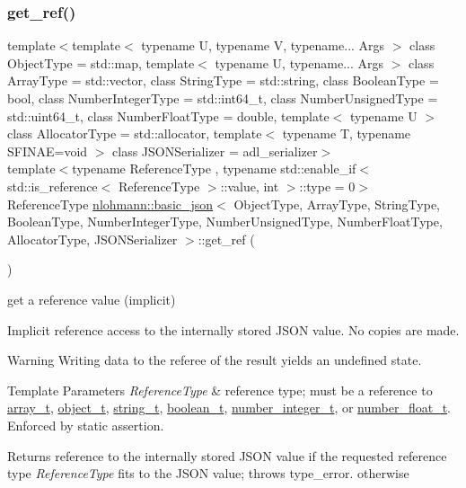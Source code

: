 \subsubsection{\texorpdfstring{get\+\_\+ref()}{get\_ref()}\hspace{0.1cm}{\footnotesize\ttfamily [1/2]}}
{\footnotesize\ttfamily template$<$template$<$ typename U, typename V, typename... Args $>$ class Object\+Type = std\+::map, template$<$ typename U, typename... Args $>$ class Array\+Type = std\+::vector, class String\+Type  = std\+::string, class Boolean\+Type  = bool, class Number\+Integer\+Type  = std\+::int64\+\_\+t, class Number\+Unsigned\+Type  = std\+::uint64\+\_\+t, class Number\+Float\+Type  = double, template$<$ typename U $>$ class Allocator\+Type = std\+::allocator, template$<$ typename T, typename S\+F\+I\+N\+A\+E=void $>$ class J\+S\+O\+N\+Serializer = adl\+\_\+serializer$>$ \\
template$<$typename Reference\+Type , typename std\+::enable\+\_\+if$<$ std\+::is\+\_\+reference$<$ Reference\+Type $>$\+::value, int $>$\+::type  = 0$>$ \\
Reference\+Type \mbox{\hyperlink{classnlohmann_1_1basic__json}{nlohmann\+::basic\+\_\+json}}$<$ Object\+Type, Array\+Type, String\+Type, Boolean\+Type, Number\+Integer\+Type, Number\+Unsigned\+Type, Number\+Float\+Type, Allocator\+Type, J\+S\+O\+N\+Serializer $>$\+::get\+\_\+ref (\begin{DoxyParamCaption}{ }\end{DoxyParamCaption})\hspace{0.3cm}{\ttfamily [inline]}}



get a reference value (implicit) 

Implicit reference access to the internally stored J\+S\+ON value. No copies are made.

\begin{DoxyWarning}{Warning}
Writing data to the referee of the result yields an undefined state.
\end{DoxyWarning}

\begin{DoxyTemplParams}{Template Parameters}
{\em Reference\+Type} & reference type; must be a reference to \mbox{\hyperlink{classnlohmann_1_1basic__json_ae095578e03df97c5b3991787f1056374}{array\+\_\+t}}, \mbox{\hyperlink{classnlohmann_1_1basic__json_a5e48a7893520e1314bf0c9723e26ea2a}{object\+\_\+t}}, \mbox{\hyperlink{classnlohmann_1_1basic__json_a61f8566a1a85a424c7266fb531dca005}{string\+\_\+t}}, \mbox{\hyperlink{classnlohmann_1_1basic__json_a4c919102a9b4fe0d588af64801436082}{boolean\+\_\+t}}, \mbox{\hyperlink{classnlohmann_1_1basic__json_a98e611d67b7bd75307de99c9358ab2dc}{number\+\_\+integer\+\_\+t}}, or \mbox{\hyperlink{classnlohmann_1_1basic__json_a88d6103cb3620410b35200ee8e313d97}{number\+\_\+float\+\_\+t}}. Enforced by static assertion.\\
\hline
\end{DoxyTemplParams}
\begin{DoxyReturn}{Returns}
reference to the internally stored J\+S\+ON value if the requested reference type {\itshape Reference\+Type} fits to the J\+S\+ON value; throws type\+\_\+error. otherwise
\end{DoxyReturn}

